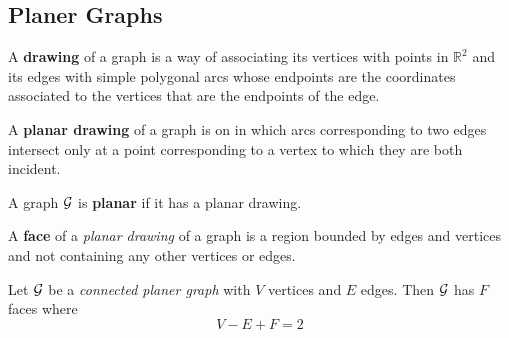 \documentclass{article}
\def\R{{\mathbb R}}
\begin{document}
		
		\subsection{Planer Graphs}
			\begin{definition}
				A \textbf{drawing} of a graph is a way of associating its vertices with points in $\R^2$ and its edges with simple polygonal arcs whose endpoints are the coordinates associated to the vertices that are the endpoints of the edge.
			\end{definition}
			
			\begin{definition}
				A \textbf{planar drawing} of a graph is on in which arcs corresponding to two edges intersect only at a point corresponding to a vertex to which they are both incident.
			\end{definition}

			\begin{definition}
				A graph $\mathcal{{G}}$ is \textbf{planar} if it has a planar drawing.
			\end{definition}
			
			\begin{definition}
				A \textbf{face} of a \emph{planar drawing} of a graph is a region bounded by edges and vertices and not containing any other vertices or edges.
			\end{definition}

			\begin{theorem}
				Let $\mathcal{{G}}$ be a \emph{connected planer graph} with $V$ vertices and $E$ edges. Then $\mathcal{{G}}$ has $F$ faces where 
				\begin{equation}
					V - E + F = 2
				\end{equation}
			\end{theorem}
			
\end{document}
